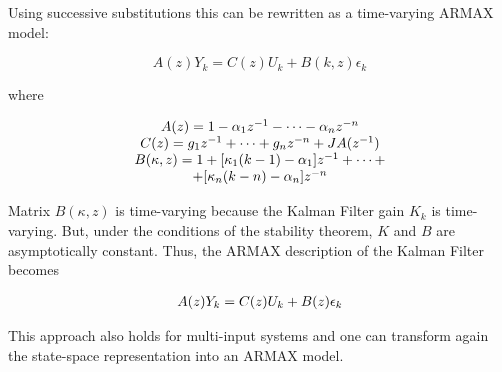 \documentclass[journal]{IEEEtran}
\begin{document}
\noindent Using successive substitutions this can be rewritten as a time-varying ARMAX model:

\begin{equation} \label{ARMAX_model_Kalman_Filter_1}
A(z){Y_k}=C(z){U_k}+B(k,z){\epsilon_k}
\end{equation}

\noindent where

\begin{equation} \label{ARMAX_model_Kalman_Filter_2}
\begin{tabular}{c}
$A(z)=1-{\alpha_1}{z^{-1}}-\cdots-{\alpha_n}{z^{-n}}$ \\
$C(z)={g_1}{z^{-1}}+\cdots+{g_n}{z^{-n}}+JA(z^{-1})$ \\
$B(\kappa,z)=1+[\kappa_1(k-1)-\alpha_1]{z^{-1}}+\cdots+$\\
$+[\kappa_n(k-n)-\alpha_n]{z^{-n}}$
\end{tabular}
\end{equation}

\noindent Matrix $B(\kappa,z)$ is time-varying because the Kalman Filter gain $K_k$ is time-varying. But, under the conditions of the stability theorem, $K$ and $B$ are asymptotically constant. Thus, the ARMAX description of the Kalman Filter becomes

\begin{equation} \label{ARMAX_model_Kalman_Filter_3}
\begin{tabular}{c}
$A(z){Y_k}=C(z)U_k+B(z)\epsilon_k$
\end{tabular}
\end{equation}

\noindent This approach also holds for multi-input systems and one can transform again the state-space representation into an ARMAX model. \\
\end{document}
